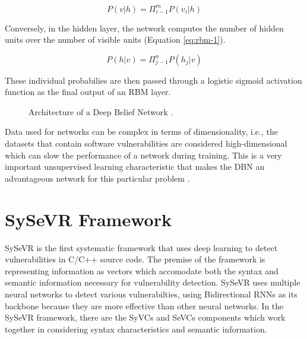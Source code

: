 \documentclass[12pt,twocolumn,letterpaper]{article}
\begin{document}
\begin{equation}
\label{eq:rbm-0}
    P(v|h)=\Pi_{i-1}^{m}P(v_{i}|h)
\end{equation}

Conversely, in the hidden layer, the network computes the number of hidden units over the number of 
visible units (Equation \ref{eq:rbm-1}).

\begin{equation}
\label{eq:rbm-1}
    P(h|v)=\Pi_{j-1}^{n}P(h_{j}|v)
\end{equation}

These individual probabilies are then passed through a logistic sigmoid activation function as the final 
output of an RBM layer.

\begin{figure}[h]
    \centering

    \caption{Architecture of a Deep Belief Network \cite{Lin20}.}
    \label{fig:dl-4}
\end{figure}

Data used for networks can be complex in terms of dimensionality, i.e., the datasets that contain software 
vulnerabilities are considered high-dimensional which can slow the performance of a network during training. 
This is a very important unsupervised learning characteristic that makes the DBN an advantageous network 
for this particular problem \cite{Lin20}.






\section{SySeVR Framework}
\label{sec:sysevr-framework}
SySeVR is the first systematic framework that uses deep learning to detect vulnerabilities in C/C++ source code. The premise of the framework is representing information as vectors which
accomodate both the syntax and semantic information necessary for vulnerability detection. SySeVR uses multiple neural networks to detect various vulnerabilties, using Bidirectional RNNs as its backbone because they are more effective than other neural networks.
In the SySeVR framework, there are the SyVCs and SeVCs components which work together in considering syntax characteristics and semantic information.
\end{document}
